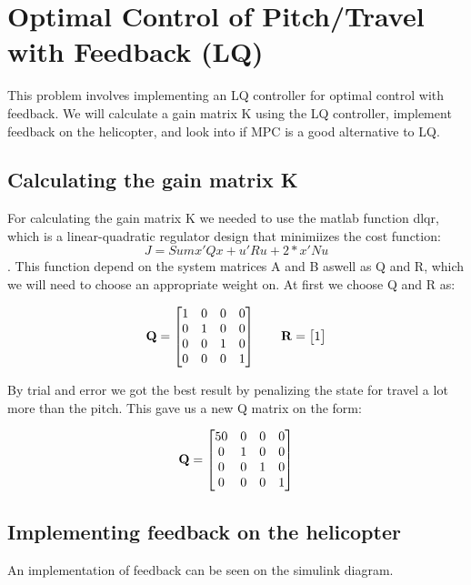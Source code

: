 \section{Optimal Control of Pitch/Travel with Feedback (LQ)}\label{sec:prob3}
This problem involves implementing an LQ controller for optimal control with feedback. We will calculate a gain matrix K using the LQ controller, implement feedback on the helicopter, and look into if MPC is a good alternative to LQ.

\subsection{Calculating the gain matrix K}
For calculating the gain matrix K we needed to use the matlab function dlqr, which is a linear-quadratic regulator design that minimiizes the cost function:
\begin{equation}
J = Sum {x'Qx + u'Ru + 2*x'Nu}
\end{equation}.
This function depend on the system matrices A and B aswell as Q and R, which we will need to choose an appropriate weight on. At first we choose Q and R as:

\begin{equation}
\bold{Q} =
\begin{bmatrix}
1 & 0 & 0 & 0 \\
0 & 1 & 0 & 0 \\
0 & 0 & 1 & 0 \\
0 & 0 & 0 & 1
\end{bmatrix}
\qquad\bold{R}=
\begin{bmatrix}
1
\end{bmatrix}
\end{equation}

 By trial and error we got the best result by penalizing the state for travel a lot more than the pitch. This gave us a new Q matrix on the form:

\begin{equation}
\bold{Q} =
\begin{bmatrix}
50 & 0 & 0 & 0 \\
0 & 1 & 0 & 0 \\
0 & 0 & 1 & 0 \\
0 & 0 & 0 & 1
\end{bmatrix}
\end{equation}

\subsection{Implementing feedback on the helicopter}
An implementation of feedback can be seen on the simulink diagram.

